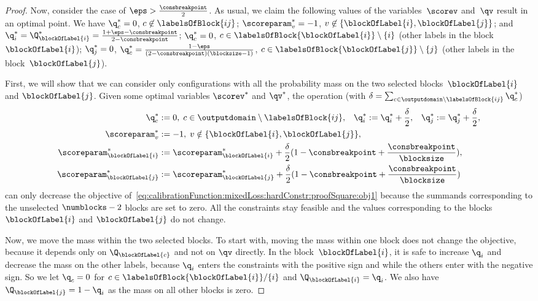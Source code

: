 \documentclass{article}
\begin{document}
\begin{proof}
    Now, consider the case of $\eps > \frac{\consbreakpoint}{2}$.
    As usual, we claim  the following values of the variables~$\scorev$ and~$\qv$ result in an optimal point. We have $\q_c^*=0$, $c\not\in \labelsOfBlock{ij}$; $\scoreparam_v^* = -1$, $v \not\in\{\blockOfLabel{i}, \blockOfLabel{j}\}$; and $\q_i^* =\Q_{\blockOfLabel{i}}^* = \frac{1+\eps-\consbreakpoint}{2-\consbreakpoint}$; $\q_c^*=0$, $c \in \labelsOfBlock{\blockOfLabel{i}} \setminus \{i\}$ (other labels in the block~$\blockOfLabel{i}$);  $\q_{j}^* = 0$, $\q_c^* = \frac{1-\eps}{(2-\consbreakpoint)(\blocksize-1)}$, $c \in \labelsOfBlock{\blockOfLabel{j}} \setminus \{j\}$ (other labels in the block~$\blockOfLabel{j}$).
    
    First, we will show that we can consider only configurations with all the probability mass on the two selected blocks~$\blockOfLabel{i}$ and $\blockOfLabel{j}$.
    Given some optimal variables $\scorev^*$ and $\qv^*$, the operation (with $\delta = \sum_{c \in \outputdomain \setminus \labelsOfBlock{ij}} \q_c^*$)
    \begin{align*}
    \q_c^* &:= 0, \; c \in \outputdomain \setminus \labelsOfBlock{ij}, &
    \q_i^* &:= \q_i^* + \frac{\delta}{2}, &
    \q_{j}^* &:= \q_{j}^* + \frac{\delta}{2}, \\
    \scoreparam_v^* &:= -1, \; \mathrlap{v \notin \{\blockOfLabel{i}, \blockOfLabel{j}\},} \\
    \scoreparam_{\blockOfLabel{i}}^* &:= \scoreparam_{\blockOfLabel{i}}^* + \mathrlap{\frac{\delta}{2}(1-\consbreakpoint+\frac{\consbreakpoint}{\blocksize}),} \\
    \scoreparam_{\blockOfLabel{j}}^* & := \scoreparam_{\blockOfLabel{j}}^* + \mathrlap{\frac{\delta}{2}(1-\consbreakpoint+\frac{\consbreakpoint}{\blocksize})}
    \end{align*}
    can only decrease the objective of~\eqref{eq:calibrationFunction:mixedLoss:hardConstr:proofSquare:obj1} because the summands corresponding to the unselected $\numblocks - 2$ blocks are set to zero.
    All the constraints stay feasible and the values corresponding to the blocks $\blockOfLabel{i}$ and $\blockOfLabel{j}$ do not change.
    
    Now, we move the mass within the two selected blocks.
    To start with, moving the mass within one block does not change the objective, because it depends only on $\Q_{\blockOfLabel{c}}$ and not on $\qv$ directly.
    In the block~$\blockOfLabel{i}$, it is safe to increase $\q_i$ and decrease the mass on the other labels, because $\q_i$ enters the constraints with the positive sign and while the others enter with the negative sign. So we let $\q_c = 0$ for $c \in \labelsOfBlock{\blockOfLabel{i}}  / \{i \}$ and $ \Q_{\blockOfLabel{i}}=\q_i$. We also have $\Q_{\blockOfLabel{j}}=1-\q_i$ as the mass on all other blocks is zero.
    

\end{proof}
\end{document}
